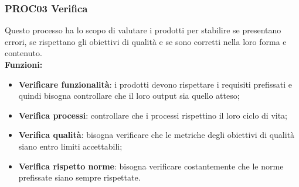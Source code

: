 \documentclass[../piano_di_qualifica.tex]{subfiles}
\begin{document}
%
%

\subsubsection{PROC03 Verifica}
Questo processo ha lo scopo di valutare i prodotti per stabilire se presentano errori, se rispettano gli obiettivi di qualità e se sono corretti nella loro forma e contenuto. \\

\textbf{Funzioni:}
\smallbreak
\begin{itemize}
	\item \textbf{Verificare funzionalità}:  i prodotti devono rispettare i requisiti prefissati e quindi bisogna controllare che il loro output sia quello atteso;
	\item \textbf{Verifica processi}:  controllare che i processi rispettino il loro ciclo di vita;
	\item \textbf{Verifica qualità}:  bisogna verificare che le metriche degli obiettivi di qualità siano entro limiti accettabili;
	\item \textbf{Verifica rispetto norme}: bisogna verificare costantemente che le norme prefissate siano sempre rispettate.
\end{itemize}
\end{document}
